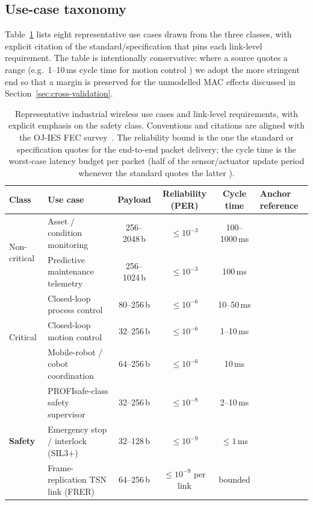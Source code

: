\documentclass[journal,onecolumn,11pt,a4paper]{IEEEtran}
\begin{document}
\subsection{Use-case taxonomy}
\label{sec:usecases-taxonomy}

Table~\ref{tab:use-cases} lists eight representative use cases drawn
from the three classes, with explicit citation of the
standard/specification that pins each link-level requirement. The
table is intentionally conservative: where a source quotes a range
(e.g.\ 1--10\,ms cycle time for motion control \cite{TS22104}) we
adopt the more stringent end so that a margin is preserved for the
unmodelled MAC effects discussed in Section~\ref{sec:cross-validation}.

\begin{table}[t]
  \centering
  \caption{Representative industrial wireless use cases and
  link-level requirements, with explicit emphasis on the
  safety class. Conventions and citations are aligned with the
  OJ-IES FEC survey~\cite{Fan22}. The reliability bound is the
  one the standard or specification quotes for the end-to-end
  packet delivery; the cycle time is the worst-case latency
  budget per packet (half of the sensor/actuator update period
  whenever the standard quotes the latter \cite{TS22104,Sch17}).}
  \label{tab:use-cases}
  \footnotesize
  \begin{tabular}{l l c c c l}
    \toprule
    Class & Use case &
      Payload & Reliability (PER) & Cycle time & Anchor reference \\
    \midrule
    \multirow{2}{*}{Non-critical}
      & Asset / condition monitoring          & 256--2048\,b & $\le 10^{-3}$  & 100--1000\,ms & \cite{TS22104,Mon24} \\
      & Predictive maintenance telemetry      & 256--1024\,b & $\le 10^{-3}$  & 100\,ms        & \cite{Mon24,Aij20} \\
    \midrule
    \multirow{3}{*}{Critical}
      & Closed-loop process control            & 80--256\,b   & $\le 10^{-6}$  & 10--50\,ms     & \cite{TS22104,Sch17} \\
      & Closed-loop motion control             & 32--256\,b   & $\le 10^{-6}$  & 1--10\,ms      & \cite{TS22104,Aij20} \\
      & Mobile-robot / cobot coordination      & 64--256\,b   & $\le 10^{-6}$  & 10\,ms         & \cite{Mon24,TS22104} \\
    \midrule
    \multirow{3}{*}{\textbf{Safety}}
      & PROFIsafe-class safety supervisor      & 32--256\,b   & $\le 10^{-8}$  & 2--10\,ms      & \cite{IEC61784,IEC61508,Gal08} \\
      & Emergency stop / interlock (SIL3+)    & 32--128\,b   & $\le 10^{-9}$  & $\le 1$\,ms     & \cite{IEC61508,Gal08} \\
      & Frame-replication TSN link (FRER)      & 64--256\,b   & $\le 10^{-9}$ per link & bounded & \cite{IEEE802CB,IEEE802Qbv} \\
    \bottomrule
  \end{tabular}
\end{table}
\end{document}
